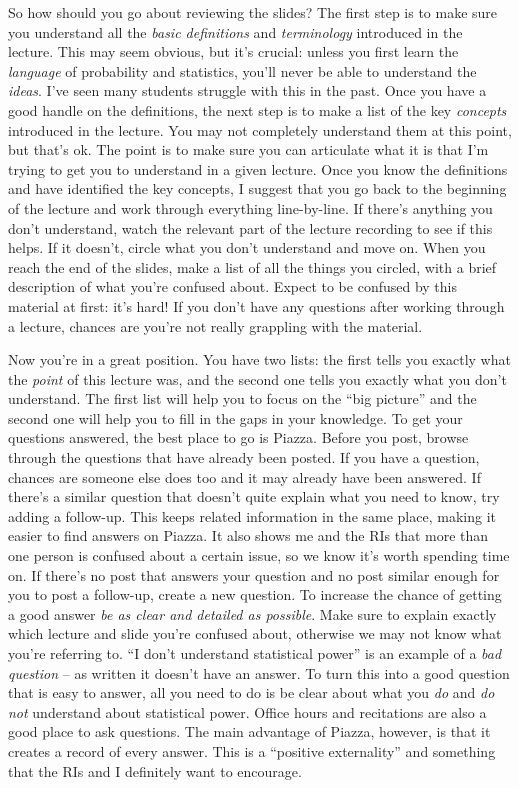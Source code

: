 \documentclass[12pt,letterpaper]{article}
\begin{document}
So how should you go about reviewing the slides?
The first step is to make sure you understand all the \emph{basic definitions} and \emph{terminology} introduced in the lecture.
This may seem obvious, but it's crucial: unless you first learn the \emph{language} of probability and statistics, you'll never be able to understand the \emph{ideas}.
I've seen many students struggle with this in the past.
Once you have a good handle on the definitions, the next step is to make a list of the key \emph{concepts} introduced in the lecture. 
You may not completely understand them at this point, but that's ok.
The point is to make sure you can articulate what it is that I'm trying to get you to understand in a given lecture.
Once you know the definitions and have identified the key concepts, I suggest that you go back to the beginning of the lecture and work through everything line-by-line.
If there's anything you don't understand, watch the relevant part of the lecture recording to see if this helps.
If it doesn't, circle what you don't understand and move on.
When you reach the end of the slides, make a list of all the things you circled, with a brief description of what you're confused about.
Expect to be confused by this material at first: it's hard!
If you don't have any questions after working through a lecture, chances are you're not really grappling with the material.

Now you're in a great position.
You have two lists: the first tells you exactly what the \emph{point} of this lecture was, and the second one tells you exactly what you don't understand.
The first list will help you to focus on the ``big picture'' and the second one will help you to fill in the gaps in your knowledge.
To get your questions answered, the best place to go is Piazza.
Before you post, browse through the questions that have already been posted.
If you have a question, chances are someone else does too and it may already have been answered.
If there's a similar question that doesn't quite explain what you need to know, try adding a follow-up.
This keeps related information in the same place, making it easier to find answers on Piazza.
It also shows me and the RIs that more than one person is confused about a certain issue, so we know it's worth spending time on.
If there's no post that answers your question and no post similar enough for you to post a follow-up, create a new question.
To increase the chance of getting a good answer \emph{be as clear and detailed as possible}.
Make sure to explain exactly which lecture and slide you're confused about, otherwise we may not know what you're referring to.
``I don't understand statistical power'' is an example of a \emph{bad question} -- as written it doesn't have an answer.
To turn this into a good question that is easy to answer, all you need to do is be clear about what you \emph{do} and \emph{do not} understand about statistical power.
Office hours and recitations are also a good place to ask questions.
The main advantage of Piazza, however, is that it creates a record of every answer.
This is a ``positive externality'' and something that the RIs and I definitely want to encourage.
\end{document}
